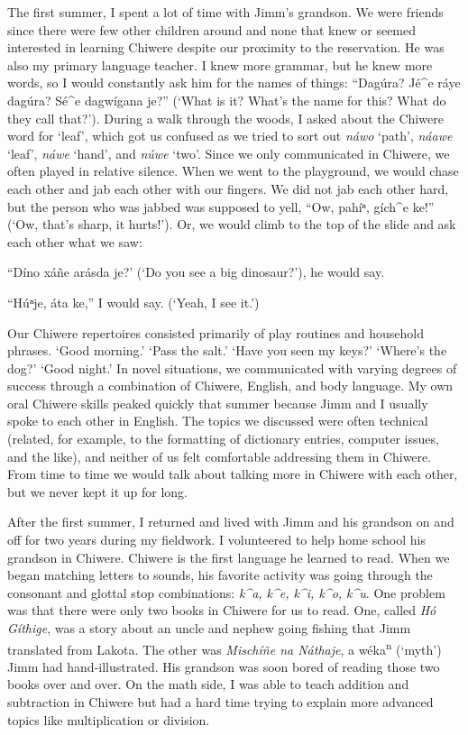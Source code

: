 \documentclass[output=paper]{LSP/langsci}
\begin{document}
The first summer, I spent a lot of time with Jimm's grandson. We were friends since there were few other children around and none that knew or seemed interested in learning Chiwere despite our proximity to the reservation. He was also my primary language teacher. I knew more grammar, but he knew more words, so I would constantly ask him for the names of things: ``Dag\'ura? J\'e\^{ }e ráye dag\'ura? S\'e\^{ }e dagwígana je?'' (`What is it? What's the name for this? What do they call that?'). During a walk through the woods, I asked about the Chiwere word for `leaf', which got us confused as we tried to sort out \emph{náwo} `path', \emph{náawe} `leaf', \emph{náwe} `hand', and \emph{n\'uwe} `two'. Since we only communicated in Chiwere, we often played in relative silence. When we went to the playground, we would chase each other and jab each other with our fingers. We did not jab each other hard, but the person who was jabbed was supposed to yell, ``Ow, pahíⁿ, gích\^{ }e ke!'' (`Ow, that's sharp, it hurts!'). Or, we would climb to the top of the slide and ask each other what we saw:

	``Díno xáñe arásda je?' (`Do you see a big dinosaur?'), he would say.
	
	``H\'uⁿje, áta ke,'' I would say. (`Yeah, I see it.')

Our Chiwere repertoires consisted primarily of play routines and household phrases. `Good morning.' `Pass the salt.' `Have you seen my keys?' `Where's the dog?' `Good night.' In novel situations, we communicated with varying degrees of success through a combination of Chiwere, English, and body language. My own oral Chiwere skills peaked quickly that summer because Jimm and I usually spoke to each other in English. The topics we discussed were often technical (related, for example, to the formatting of dictionary entries, computer issues, and the like), and neither of us felt comfortable addressing them in Chiwere. From time to time we would talk about talking more in Chiwere with each other, but we never kept it up for long.

After the first summer, I returned and lived with Jimm and his grandson on and off for two years during my fieldwork. I volunteered to help home school his grandson in Chiwere. Chiwere is the first language he learned to read. When we began matching letters to sounds, his favorite activity was going through the consonant and glottal stop combinations: \emph{k\^{ }a, k\^{ }e, k\^{ }i, k\^{ }o, k\^{ }u}. One problem was that there were only two books in Chiwere for us to read. One, called \emph{Hó Gíthige}, was a story about an uncle and nephew going fishing that Jimm translated from Lakota. The other was \emph{Mischíñe na Náthaje}, a w\'eka\textsuperscript{n} (`myth') Jimm had hand-illustrated. His grandson was soon bored of reading those two books over and over. On the math side, I was able to teach addition and subtraction in Chiwere but had a hard time trying to explain more advanced topics like multiplication or division.
\end{document}
